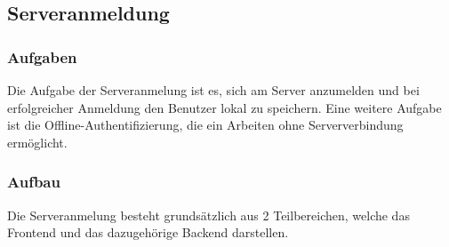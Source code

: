 
\subsection{Serveranmeldung}

\subsubsection{Aufgaben}
Die Aufgabe der Serveranmelung ist es, sich am Server anzumelden und bei erfolgreicher Anmeldung den Benutzer lokal zu speichern. Eine weitere Aufgabe ist die Offline-Authentifizierung, die ein Arbeiten ohne Serververbindung ermöglicht. 

\subsubsection{Aufbau}
Die Serveranmelung besteht grundsätzlich aus 2 Teilbereichen, welche das Frontend und das dazugehörige Backend darstellen.

